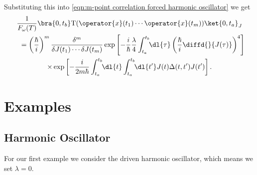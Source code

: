 \documentclass[fleqn]{NotesClass}
\newcommand*{\timeorder}{\mathrm{T}}
\begin{document}
    Substituting this into \cref{eqn:m-point correlation forced harmonic oscillator} we get
    \begin{multline}\label{eqn:homogeneous m-point correlation function}
        \frac{1}{F_{\omega}(T)}\bra{0, t_b} \timeorder(\operator{x}(t_1) \dotsm \operator{x}(t_m)) \ket{0, t_a}_J\\
        \quad= \left( \frac{\hbar}{i} \right)^{m} \frac{\delta^m}{\delta J(t_1) \dotsm \delta J(t_m)} \exp\left[ -\frac{i}{\hbar} \frac{\lambda}{4} \int_{t_a}^{t_b} \!\! \dl{\tau} \left( \frac{\hbar}{i} \diffd{}{J(\tau)} \right)^4 \right]\\
        \times \exp\left[ -\frac{i}{2m\hbar} \int_{t_a}^{t_b} \!\! \dl{t} \int_{t_a}^{t_b} \!\! \dl{t'} J(t)\Delta(t, t')J(t') \right].
    \end{multline}
    
    \section{Examples}
    \subsection{Harmonic Oscillator}
    For our first example we consider the driven harmonic oscillator, which means we set \(\lambda = 0\).
\end{document}
